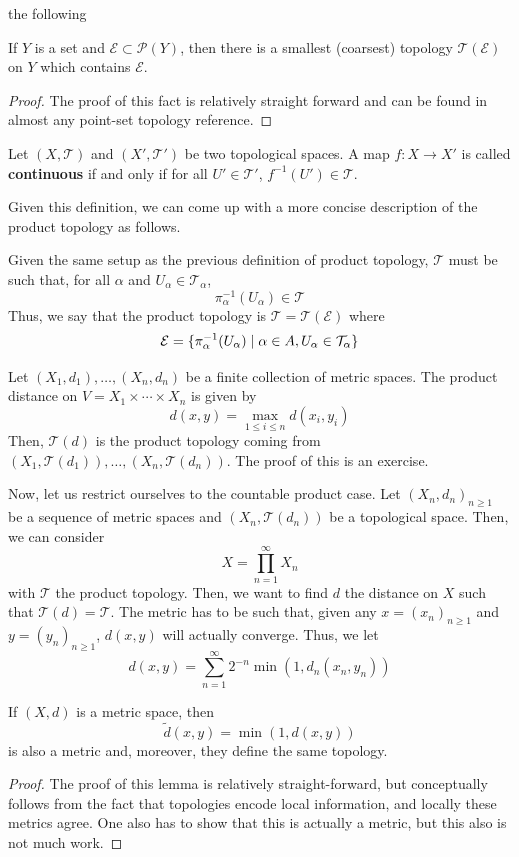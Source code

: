 \documentclass[11pt,leqno,oneside]{amsbook}
\numberwithin{thm}{section}
\renewcommand{\P}{\mathcal{P}} %
\newcommand{\Ep}{\mathcal{E}} %
\newcommand{\Top}{\mathcal{T}} %
\renewcommand{\de}{\textbf} %
\begin{document}
the following
\begin{prop}
  If $Y$ is a set and $\Ep \subset \P(Y)$, then there is a smallest (coarsest)
topology $\Top(\Ep)$ on $Y$ which contains $\Ep$.
\end{prop}
\begin{proof}
  The proof of this fact is relatively straight forward and can be
  found in almost any point-set topology reference.
\end{proof}
\begin{defn}
  Let $(X,\Top)$ and $(X',\Top')$ be two topological spaces. A map $f\colon
  X \to X'$ is called \de{continuous} if and only if for all $U' \in
  \Top'$, $f^{-1}(U') \in \Top$.
\end{defn}
Given this definition, we can come up with a more concise description
of the product topology as follows.
\begin{defn}
  Given the same setup as the previous definition of product topology,
  $\Top$ must be such that, for all $\alpha$ and $U_\alpha \in
  \Top_\alpha$, \[
    \pi_\alpha^{-1}(U_\alpha) \in \Top
  \]
  Thus, we say that the product topology is $\Top = \Top(\Ep)$
  where \[
    \Ep = \{\pi_{\alpha}^{-1}(U_\alpha) \st \alpha \in A, U_\alpha
    \in \Top_\alpha\}
  \]
\end{defn}
\begin{rmk}
  Let $(X_1,d_1), \ldots, (X_n,d_n)$ be a finite collection of metric
  spaces. The product distance on $V = X_1 \times \cdots \times X_n$
  is given by \[
    d(x,y) = \max_{1 \leq i \leq n} d(x_i,y_i)
  \]
  Then, $\Top(d)$ is the product topology coming from
  $(X_1,\Top(d_1)), \ldots, (X_n,\Top(d_n))$. The proof of this is an
  exercise.
\end{rmk}
Now, let us restrict ourselves to the countable product case. Let
$(X_n,d_n)_{n \geq 1}$ be a sequence of metric spaces and
$(X_n,\Top(d_n))$ be a topological space. Then, we can consider \[
  X = \prod_{n=1}^\infty X_n
\]
with $\Top$ the product topology. Then, we want to find $d$ the
distance on $X$ such that $\Top(d) = \Top$. The metric has to be such
that, given any $x = (x_n)_{n \geq 1}$ and $y = (y_n)_{n \geq 1}$,
$d(x,y)$ will actually converge. Thus, we let \[
  d(x,y) = \sum_{n=1}^\infty 2^{-n} \min(1,d_n(x_n,y_n))
\]
\begin{lem}
  If $(X,d)$ is a metric space, then \[
    \tilde{d}(x,y) = \min(1,d(x,y))
  \]
  is also a metric and, moreover, they define the same topology.
\end{lem}
\begin{proof}
  The proof of this lemma is relatively straight-forward, but
  conceptually follows from the fact that topologies encode local
  information, and locally these metrics agree. One also has to show
  that this is actually a metric, but this also is not much work.
\end{proof}
\end{document}
